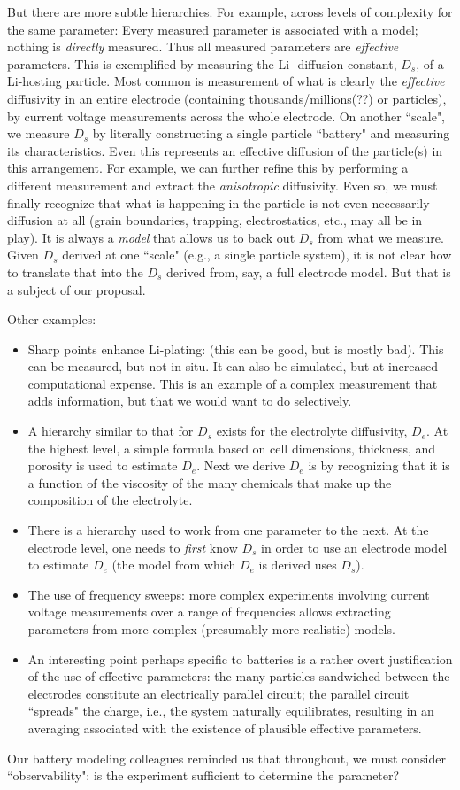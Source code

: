 \documentclass[11pt]{article}
\begin{document}
But there are more subtle hierarchies.  For example,  
across levels of complexity for the same parameter:  Every measured parameter is associated with a model; nothing 
is \emph{directly} measured.  Thus all measured parameters are \emph{effective} parameters.
This is exemplified by measuring the Li- diffusion constant, $D_s$, of a Li-hosting particle. 
Most common is measurement of what is clearly the \emph{effective} diffusivity in an entire
electrode (containing thousands/millions(??) or particles), by current voltage measurements across the whole electrode.
  On another ``scale", we measure $D_s$ 
by literally constructing a single particle ``battery" and measuring its characteristics.  Even this represents an effective
diffusion of the particle(s) in this arrangement.  For example, we can further refine this by performing a 
different measurement and extract the \emph{anisotropic} diffusivity.  Even so, we must finally recognize that what is happening
in the particle is not even necessarily diffusion at all (grain boundaries, trapping, electrostatics, etc., may all be in play).
It is always a \emph{model} that allows us to back out $D_s$ from what we measure.  Given $D_s$ derived at one ``scale" (e.g., 
a single particle system), it is not clear how to translate that into the $D_s$ derived from, say, a full electrode model.
But that is a subject of our proposal.

Other examples:
\begin{itemize}
\item Sharp points enhance Li-plating: (this can be good, but is mostly bad).  This can be measured, but not in situ.  It can also be
simulated, but at increased computational expense.  This is an example of a complex measurement that adds
information, but that we would want to do selectively.
\item A hierarchy similar to that for $D_s$ exists for the electrolyte diffusivity, $D_e$.  At the highest level, a simple formula based on cell dimensions, thickness, and porosity is used to estimate $D_e$.  Next we derive $D_e$ is by recognizing that it is a function of the viscosity of the many chemicals that make up the composition of the electrolyte. 
\item  There is a hierarchy used to work from one parameter to the next.  At the electrode level, one needs to \emph{first} 
know $D_s$ in order to use an electrode model to estimate $D_e$ (the model from which $D_e$ is derived uses $D_s$).
\item  The use of frequency sweeps: more complex experiments involving current voltage measurements over a range of frequencies allows
extracting parameters from more complex (presumably more realistic) models.
\item An interesting point perhaps specific to batteries is a rather overt justification of
 the use of effective parameters: the many particles sandwiched between the electrodes constitute an
electrically parallel circuit; the parallel circuit ``spreads" the charge, i.e., the
system naturally equilibrates, resulting in an averaging associated with the existence of plausible effective parameters.
\end{itemize}

Our battery modeling colleagues reminded us that throughout, we must consider 
``observability": is the experiment sufficient to determine the parameter?





\end{document}

